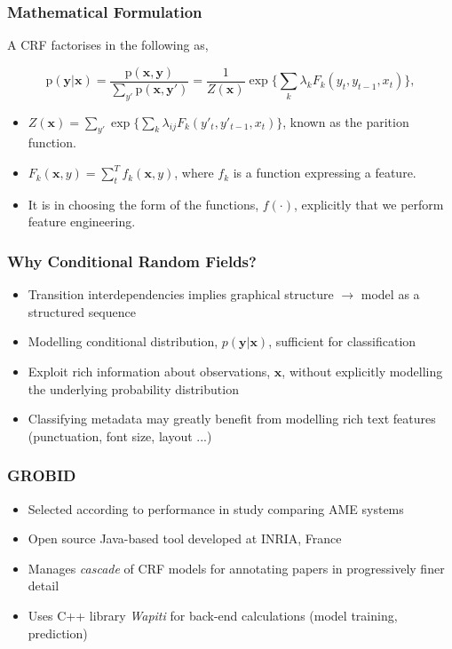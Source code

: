 \documentclass{beamer}
\newcommand{\p}{\text{p}}
\begin{document}
\begin{frame}
\frametitle{Mathematical Formulation}

A CRF factorises in the following as,

$$
\p(\textbf{y}|\textbf{x}) = \frac{\p(\textbf{x}, \textbf{y})}{\sum_{y'}{\p(\textbf{x}, \textbf{y}')}} = \frac{1}{Z(\mathbf{x})}\exp \Bigg\{\sum_k{
\lambda_{k}F_{k}(y_t, y_{t-1}, x_t)
}\Bigg\},
$$

\begin{itemize}
\item  $Z(\mathbf{x}) = \sum_{y'}\exp \Big\{\sum_k{\lambda_{ij}F_{k}(y'_t, y'_{t-1}, x_t)}\Big\}$, known as the parition function.
\item $F_k(\mathbf{x}, y) = \sum_t^T f_k(\mathbf{x}, y)$, where $f_k$ is a function expressing a feature.
\item It is in choosing the form of the functions, $f(\cdot)$, explicitly that we perform feature engineering.
\end{itemize}

\end{frame}


\begin{frame}
\frametitle{Why Conditional Random Fields?}
\begin{itemize}
\item Transition interdependencies implies graphical structure $\rightarrow$ model as a structured sequence
\item Modelling conditional distribution, $p(\textbf{y}|\textbf{x})$, sufficient for classification
\item Exploit rich information about observations, $\textbf{x}$, without explicitly modelling the underlying probability distribution
\item Classifying metadata may greatly benefit from modelling rich text features (punctuation, font size, layout ...)
\end{itemize}
\end{frame}


\begin{frame}
\frametitle{GROBID}
\begin{itemize}
\item Selected according to performance in study comparing AME systems
\item Open source Java-based tool developed at INRIA, France
\item Manages \emph{cascade} of CRF models for annotating papers in progressively finer detail
\item Uses C++ library \emph{Wapiti} for back-end calculations (model training, prediction)
\end{itemize}
\end{frame}
\end{document}
